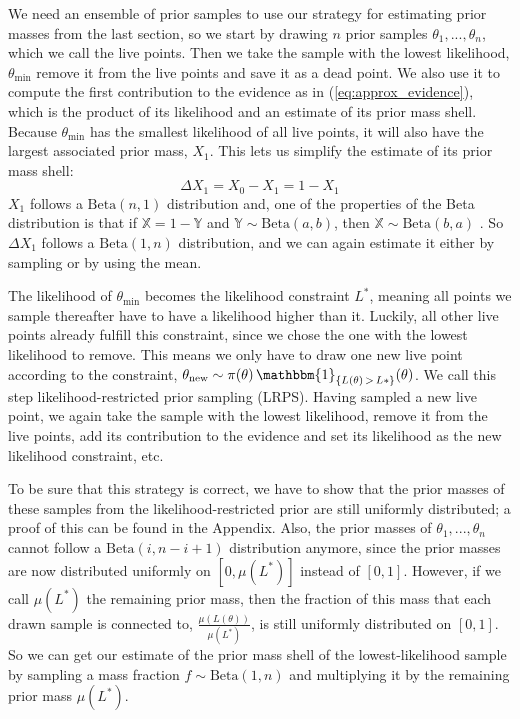 \documentclass[12pt, a4paper]{report}
\begin{document}
We need an ensemble of prior samples to use our strategy for estimating prior masses from the last section, so we start by drawing $n$ prior samples $\theta_1, ..., \theta_n$, which we call the live points.
Then we take the sample with the lowest likelihood, $\theta_{\textrm{min}}$ remove it from the live points and save it as a dead point.
We also use it to compute the first contribution to the evidence as in (\ref{eq:approx_evidence}), which is the product of its likelihood and an estimate of its prior mass shell.
Because $\theta_{\textrm{min}}$ has the smallest likelihood of all live points, it will also have the largest associated prior mass, $X_1$. 
This lets us simplify the estimate of its prior mass shell:
$$
    \Delta X_1 = X_0 - X_1 = 1 - X_1
$$
$X_1$ follows a $\textrm{Beta}(n,1)$ distribution and, one of the properties of the Beta distribution is that if $\mathbb{X} = 1 - \mathbb{Y}$ and $\mathbb{Y} \sim \textrm{Beta}(a,b)$, then $\mathbb{X} \sim \textrm{Beta}(b,a)$ \cite[5.17.2.]{beta_dist}.
So $\Delta X_1$ follows a $\textrm{Beta}(1,n)$ distribution, and we can again estimate it either by sampling or by using the mean.

The likelihood of $\theta_{\textrm{min}}$ becomes the likelihood constraint $L^*$, meaning all points we sample thereafter have to have a likelihood higher than it.
Luckily, all other live points already fulfill this constraint, since we chose the one with the lowest likelihood to remove.
This means we only have to draw one new live point according to the constraint, $\theta_{\textrm{new}} \sim \pi(\theta) \, \mathbbm{1}_{\{L(\theta) \,>\, L*\}}(\theta)$.
We call this step likelihood-restricted prior sampling (LRPS).
Having sampled a new live point, we again take the sample with the lowest likelihood, remove it from the live points, add its contribution to the evidence and set its likelihood as the new likelihood constraint, etc.

To be sure that this strategy is correct, we have to show that the prior masses of these samples from the likelihood-restricted prior are still uniformly distributed; a proof of this can be found in the Appendix.
Also, the prior masses of $\theta_1, ..., \theta_n$ cannot follow a $\textrm{Beta}(i, n-i+1)$ distribution anymore, since the prior masses are now distributed uniformly on $[0,\mu(L^*)]$ instead of $[0,1]$.
However, if we call $\mu(L^*)$ the remaining prior mass, then the fraction of this mass that each drawn sample is connected to, $\frac{\mu(L(\theta))}{\mu(L^*)}$, is still uniformly distributed on $[0,1]$.
So we can get our estimate of the prior mass shell of the lowest-likelihood sample by sampling a mass fraction $f \sim \textrm{Beta}(1, n)$ and multiplying it by the remaining prior mass $\mu(L^*)$.
\end{document}
